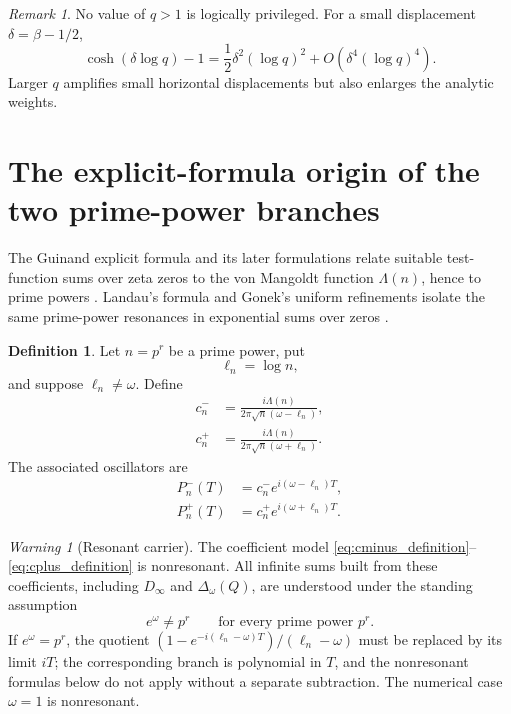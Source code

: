 \documentclass[11pt]{amsart}
\numberwithin{equation}{section}
\theoremstyle{plain}
\theoremstyle{definition}
\newtheorem{definition}[theorem]{Definition}
\theoremstyle{remark}
\newtheorem{remark}[theorem]{Remark}
\newtheorem{warning}[theorem]{Warning}
\newcommand{\1}{\mathbf{1}}
\begin{document}
\begin{remark}
\label{rem:q_sensitivity}
No value of \(q>1\) is logically privileged.  For a small displacement
\(\delta=\beta-1/2\),
\begin{equation}
\cosh(\delta\log q)-1
=
\frac12\delta^2(\log q)^2
+
O\left(\delta^4(\log q)^4\right).
\label{eq:q_sensitivity}
\end{equation}
Larger \(q\) amplifies small horizontal displacements but also enlarges
the analytic weights.
\end{remark}

\section{The explicit-formula origin of the two prime-power branches}
\label{sec:explicit_formula_branches}

The Guinand explicit formula and its later formulations relate suitable
test-function sums over zeta zeros to the von Mangoldt function
\(\Lambda(n)\), hence to prime powers \cite{Guinand1948,Weil1952}.
Landau's formula and Gonek's uniform refinements isolate the same
prime-power resonances in exponential sums over zeros
\cite{Gonek1985,FordZaharescu2005,FordSoundararajanZaharescu2009}.

\begin{definition}
\label{def:prime_power_coefficients}
Let \(n=p^r\) be a prime power, put
\begin{equation}
\ell_n=\log n,
\label{eq:elln_definition}
\end{equation}
and suppose \(\ell_n\neq\omega\).  Define
\begin{align}
c_n^-
&=
\frac{i\Lambda(n)}
{2\pi\sqrt n(\omega-\ell_n)},
\label{eq:cminus_definition}
\\
c_n^+
&=
\frac{i\Lambda(n)}
{2\pi\sqrt n(\omega+\ell_n)}.
\label{eq:cplus_definition}
\end{align}
The associated oscillators are
\begin{align}
P_n^-(T)
&=
c_n^-e^{i(\omega-\ell_n)T},
\label{eq:Pminus_definition}
\\
P_n^+(T)
&=
c_n^+e^{i(\omega+\ell_n)T}.
\label{eq:Pplus_definition}
\end{align}
\end{definition}

\begin{warning}[Resonant carrier]
\label{warn:prime_power_resonance}
The coefficient model
\eqref{eq:cminus_definition}--\eqref{eq:cplus_definition} is
nonresonant.  All infinite sums built from these coefficients, including
\(D_\infty\) and \(\Delta_\omega(Q)\), are understood under the standing
assumption
\begin{equation}
e^\omega\neq p^r
\qquad
\text{for every prime power }p^r.
\label{eq:nonresonant_carrier_assumption}
\end{equation}
If \(e^\omega=p^r\), the quotient
\((1-e^{-i(\ell_n-\omega)T})/(\ell_n-\omega)\) must be replaced by its
limit \(iT\); the corresponding branch is polynomial in \(T\), and the
nonresonant formulas below do not apply without a separate subtraction.
The numerical case \(\omega=1\) is nonresonant.
\end{warning}
\end{document}
